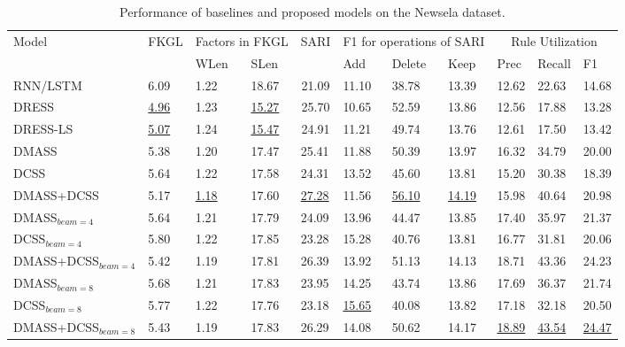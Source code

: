 \documentclass[11pt,a4paper]{article}
\begin{document}
\begin{table*}[!h]
\fontsize{9}{9}\selectfont
\centering
\renewcommand{\arraystretch}{1.3}
\begin{tabular}{|l|l|ll|l|lll|lll|}
\hline
\multirow{2}{*}{Model} & \multicolumn{1}{c|}{\multirow{2}{*}{FKGL}} & \multicolumn{2}{c|}{Factors in FKGL} & \multicolumn{1}{c|}{\multirow{2}{*}{SARI}} & \multicolumn{3}{c|}{F1 for operations of SARI} & \multicolumn{3}{c|}{Rule Utilization} \\ \cline{3-4} \cline{6-11} 
 & \multicolumn{1}{c|}{} & \multicolumn{1}{l|}{WLen} & SLen & \multicolumn{1}{c|}{} & \multicolumn{1}{l|}{Add} & \multicolumn{1}{l|}{Delete} & Keep & \multicolumn{1}{l|}{Prec} & \multicolumn{1}{l|}{Recall} & F1 \\ \hline
RNN/LSTM & 6.09 & 1.22 & 18.67 & \multicolumn{1}{c|}{21.09} & 11.10 & 38.78 & 13.39 & 12.62 & 22.63 & 14.68 \\
DRESS & \underline{4.96} & 1.23 & \underline{15.27} & \multicolumn{1}{c|}{25.70} & 10.65 & 52.59 & 13.86 & 12.56 & 17.88 & 13.28 \\
DRESS-LS & \underline{5.07} & 1.24 & \underline{15.47} & \multicolumn{1}{c|}{24.91} & 11.21 & 49.74 & 13.76 & 12.61 & 17.50 & 13.42 \\ \hline
DMASS & 5.38 & 1.20 & 17.47 & 25.41 & 11.88 & 50.39 & 13.97 & 16.32 & 34.79 & 20.00 \\
DCSS & 5.64 & 1.22 & 17.58 & 24.31 & 13.52 & 45.60 & 13.81 & 15.20 & 30.38 & 18.39 \\
DMASS+DCSS & 5.17 & \underline{1.18} & 17.60 & \underline{27.28} & 11.56 & \underline{56.10} & \underline{14.19} & 15.98 & 40.64 & 20.98 \\ \hline
DMASS$_{beam=4}$ & 5.64 & 1.21 & 17.79 & 24.09 & 13.96 & 44.47 & 13.85 & 17.40 & 35.97 & 21.37 \\
DCSS$_{beam=4}$ & 5.80 & 1.22 & 17.85 & 23.28 & 15.28 & 40.76 & 13.81 & 16.77 & 31.81 & 20.06 \\
DMASS+DCSS$_{beam=4}$ & 5.42 & 1.19 & 17.81 & 26.39 & 13.92 & 51.13 & 14.13 & 18.71 & 43.36 & 24.23 \\ \hline
DMASS$_{beam=8}$ & 5.68 & 1.21 & 17.83 & 23.95 & 14.25 & 43.74 & 13.86 & 17.69 & 36.37 & 21.74 \\
DCSS$_{beam=8}$ & 5.77 & 1.22 & 17.76 & 23.18 & \underline{15.65} & 40.08 & 13.82 & 17.18 & 32.18 & 20.50 \\
DMASS+DCSS$_{beam=8}$ & 5.43 & 1.19 & 17.83 & 26.29 & 14.08 & 50.62 & 14.17 & \underline{18.89} & \underline{43.54} & \underline{24.47} \\ \hline
\end{tabular}
\caption{Performance of baselines and proposed models on the Newsela dataset.}
\label{tab:perf_newsela}
\end{table*}
\end{document}
